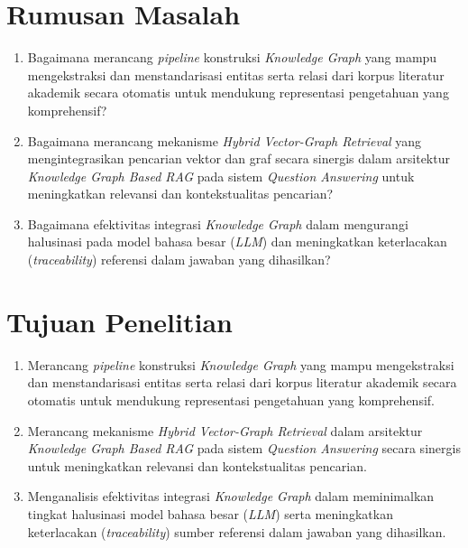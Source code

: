 \section{Rumusan Masalah}

\begin{enumerate}[label=\arabic*., leftmargin=0.75cm]
    \item Bagaimana merancang \textit{pipeline} konstruksi \textit{Knowledge Graph} yang mampu mengekstraksi dan menstandarisasi entitas serta relasi dari korpus literatur akademik secara otomatis untuk mendukung representasi pengetahuan yang komprehensif?

    \item Bagaimana merancang mekanisme \textit{Hybrid Vector-Graph Retrieval} yang mengintegrasikan pencarian vektor dan graf secara sinergis dalam arsitektur \textit{Knowledge Graph Based RAG} pada sistem \textit{Question Answering} untuk meningkatkan relevansi dan kontekstualitas pencarian?

    \item Bagaimana efektivitas integrasi \textit{Knowledge Graph} dalam mengurangi halusinasi pada model bahasa besar (\textit{LLM}) dan meningkatkan keterlacakan (\textit{traceability}) referensi dalam jawaban yang dihasilkan?
\end{enumerate}

\section{Tujuan Penelitian}

\begin{enumerate}[label=\arabic*., leftmargin=0.75cm]
    \item Merancang \textit{pipeline} konstruksi \textit{Knowledge Graph} yang mampu mengekstraksi dan menstandarisasi entitas serta relasi dari korpus literatur akademik secara otomatis untuk mendukung representasi pengetahuan yang komprehensif.

    \item Merancang mekanisme \textit{Hybrid Vector-Graph Retrieval} dalam arsitektur \textit{Knowledge Graph Based RAG} pada sistem \textit{Question Answering} secara sinergis untuk meningkatkan relevansi dan kontekstualitas pencarian.

    \item Menganalisis efektivitas integrasi \textit{Knowledge Graph} dalam meminimalkan tingkat halusinasi model bahasa besar (\textit{LLM}) serta meningkatkan keterlacakan (\textit{traceability}) sumber referensi dalam jawaban yang dihasilkan.
\end{enumerate}

